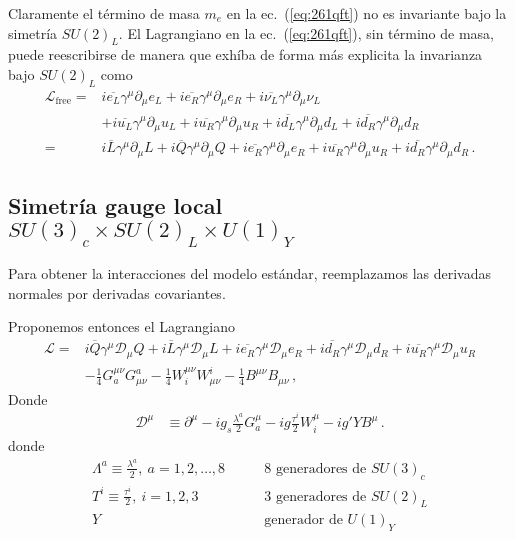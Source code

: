 \begin{frame}
Claramente el término de masa $m_e$ en la ec.~(\ref{eq:261qft}) no es invariante bajo la simetría $SU(2)_L$. El Lagrangiano en la ec.~(\ref{eq:261qft}), sin término de masa, puede reescribirse de manera que exhíba de forma más explicita la invarianza bajo $SU(2)_L$ como
\begin{align}
  \mathcal{L}_{\text{free}}
=&i\overline{e_L}\gamma^\mu\partial_\mu e_L+i\overline{e_R}\gamma^\mu\partial_\mu e_R+i\overline{\nu_L}\gamma^\mu\partial_\mu\nu_L\nonumber\\
&+i\overline{u_L}\gamma^\mu\partial_\mu u_L+i\overline{u_R}\gamma^\mu\partial_\mu u_R
+i\overline{d_L}\gamma^\mu\partial_\mu d_L+i\overline{d_R}\gamma^\mu\partial_\mu d_R\nonumber\\
=&i\overline{L}\gamma^\mu\partial_\mu L+i\overline{Q}\gamma^\mu\partial_\mu Q+i\overline{e_R}\gamma^\mu\partial_\mu e_R
+i\overline{u_R}\gamma^\mu\partial_\mu u_R
+i\overline{d_R}\gamma^\mu\partial_\mu d_R\,.
\end{align}


\subsection*{Simetría gauge local $SU(3)_c\times  SU(2)_L\times  U(1)_Y$}

Para obtener la interacciones del modelo estándar, reemplazamos las derivadas normales por derivadas covariantes.

Proponemos entonces el Lagrangiano
\begin{align}
     \mathcal{L}=&i\overline{Q}\gamma^\mu\mathcal{D}_\mu Q+i\overline{L}\gamma^\mu\mathcal{D}_\mu L+
i\overline{e_R}\gamma^\mu\mathcal{D}_\mu {e_R}+i\overline{d_R}\gamma^\mu\mathcal{D}_\mu {d_R}+i\overline{u_R}\gamma^\mu\mathcal{D}_\mu {u_R}
\nonumber\\
     &-\tfrac{1}{4}G^{\mu\nu}_a G_{\mu\nu}^a-\tfrac{1}{4}W^{\mu\nu}_i W_{\mu\nu}^i-\tfrac{1}{4}B^{\mu\nu} B_{\mu\nu}\,,
\end{align}
Donde
\begin{align}
  \mathcal{D}^\mu&\equiv\partial^\mu-i g_s\frac{\lambda^a}{2}G^\mu_a-i g \frac{\tau^i}{2}W^\mu_i-i g'YB^\mu\,.
\end{align}
donde
\begin{align*}
  \Lambda^a\equiv\frac{\lambda^a}{2},\ a=1,2,\ldots,8 &\qquad\text{8 generadores de $SU(3)_c$}\\
  T^i\equiv\frac{\tau^i}{2},\ i=1,2,3 &\qquad\text{3 generadores de $SU(2)_L$}\\
  Y &\qquad\text{generador de $U(1)_Y$}
\end{align*}


\end{frame}
